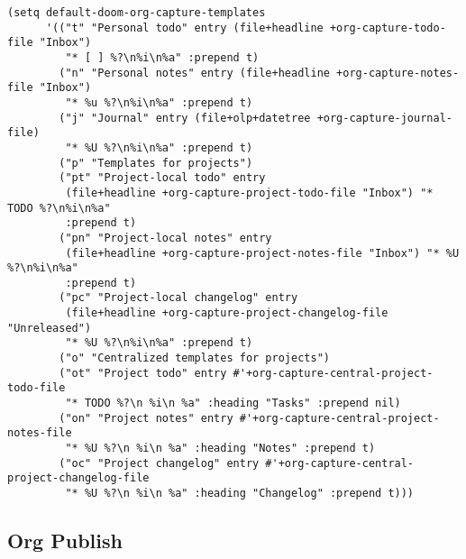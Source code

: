 \documentclass[11pt]{article}
\begin{document}
\begin{verbatim}
(setq default-doom-org-capture-templates
      '(("t" "Personal todo" entry (file+headline +org-capture-todo-file "Inbox")
         "* [ ] %?\n%i\n%a" :prepend t)
        ("n" "Personal notes" entry (file+headline +org-capture-notes-file "Inbox")
         "* %u %?\n%i\n%a" :prepend t)
        ("j" "Journal" entry (file+olp+datetree +org-capture-journal-file)
         "* %U %?\n%i\n%a" :prepend t)
        ("p" "Templates for projects")
        ("pt" "Project-local todo" entry
         (file+headline +org-capture-project-todo-file "Inbox") "* TODO %?\n%i\n%a"
         :prepend t)
        ("pn" "Project-local notes" entry
         (file+headline +org-capture-project-notes-file "Inbox") "* %U %?\n%i\n%a"
         :prepend t)
        ("pc" "Project-local changelog" entry
         (file+headline +org-capture-project-changelog-file "Unreleased")
         "* %U %?\n%i\n%a" :prepend t)
        ("o" "Centralized templates for projects")
        ("ot" "Project todo" entry #'+org-capture-central-project-todo-file
         "* TODO %?\n %i\n %a" :heading "Tasks" :prepend nil)
        ("on" "Project notes" entry #'+org-capture-central-project-notes-file
         "* %U %?\n %i\n %a" :heading "Notes" :prepend t)
        ("oc" "Project changelog" entry #'+org-capture-central-project-changelog-file
         "* %U %?\n %i\n %a" :heading "Changelog" :prepend t)))
\end{verbatim}
\subsection{Org Publish}
\label{sec:org12f5e31}
\end{document}
